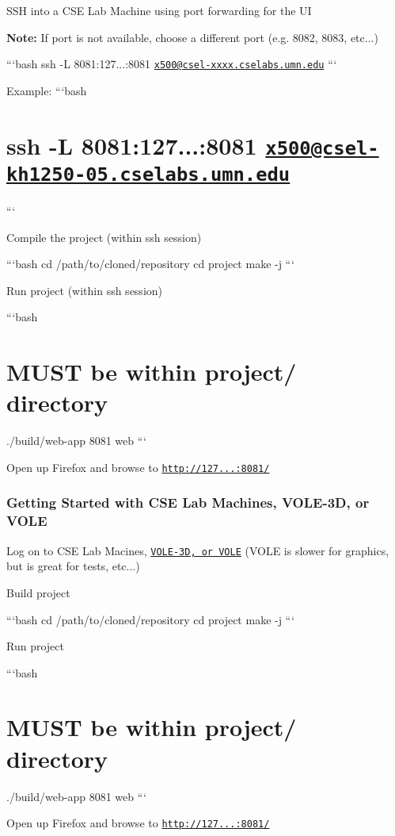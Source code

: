 \begin{DoxyEnumerate}
\item S\+SH into a C\+SE Lab Machine using port forwarding for the UI

{\bfseries Note\+:} If port {} is not available, choose a different port (e.\+g. 8082, 8083, etc...)

```bash ssh -\/L 8081\+:127...\+:8081 \href{mailto:x500@csel-xxxx.cselabs.umn.edu}{\tt x500@csel-\/xxxx.\+cselabs.\+umn.\+edu} ```

Example\+: ```bash \section*{ssh -\/L 8081\+:127...\+:8081 \href{mailto:x500@csel-kh1250-05.cselabs.umn.edu}{\tt x500@csel-\/kh1250-\/05.\+cselabs.\+umn.\+edu}}

```
\item Compile the project (within ssh session)

```bash cd /path/to/cloned/repository cd project make -\/j ```
\begin{DoxyEnumerate}
\item Run project (within ssh session)

```bash \section*{M\+U\+ST be within project/ directory}

./build/web-\/app 8081 web ```
\end{DoxyEnumerate}
\item Open up Firefox and browse to \href{http://127.0.0.1:8081/}{\tt http\+://127...\+:8081/}
\end{DoxyEnumerate}

\subsubsection*{Getting Started with C\+SE Lab Machines, V\+O\+L\+E-\/3D, or V\+O\+LE}


\begin{DoxyEnumerate}
\item Log on to C\+SE Lab Macines, \href{https://vole.cse.umn.edu/}{\tt V\+O\+L\+E-\/3D, or V\+O\+LE} (V\+O\+LE is slower for graphics, but is great for tests, etc...)
\item Build project

```bash cd /path/to/cloned/repository cd project make -\/j ```
\begin{DoxyEnumerate}
\item Run project

```bash \section*{M\+U\+ST be within project/ directory}

./build/web-\/app 8081 web ```
\item Open up Firefox and browse to \href{http://127.0.0.1:8081/}{\tt http\+://127...\+:8081/} 
\end{DoxyEnumerate}
\end{DoxyEnumerate}